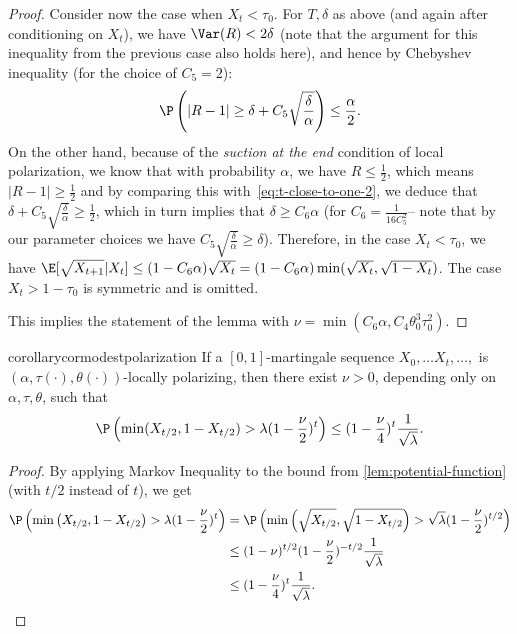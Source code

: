 \documentclass[11pt]{article}
\begin{document}
\begin{proof}
	Consider now the case when $X_t < \tau_0$. For $T, \delta$ as above (and again after conditioning on $X_t$), we have $\Var(R) < 2\delta$ (note that the argument for this inequality from the previous case also holds here), and hence by Chebyshev inequality (for the choice of $C_5=2$): 
	\begin{equation}
		\P\left(|R - 1| \ge \delta +  C_5 \sqrt{\frac{\delta}{\alpha}}\right) \leq \frac{\alpha}{2}.
		\label{eq:t-close-to-one-2}
	\end{equation}
	On the other hand, because of the \emph{suction at the end} condition of local polarization, we know that with probability $\alpha$, we have $R \le \frac{1}{2}$,
	which means $|R - 1| \ge \frac{1}{2}$ and by comparing this with~\cref{eq:t-close-to-one-2},
	we deduce that $\delta +  C_5 \sqrt{\frac{\delta}{\alpha}}\ge \frac 12$, which in turn implies that $\delta \geq C_6 \alpha$ (for $C_6=\frac{1}{16 C_5^2}$-- note that by our parameter choices we have $C_5 \sqrt{\frac{\delta}{\alpha}}\ge \delta$). 
	Therefore, in the case $X_t < \tau_0$, we have $\E [\sqrt{X_{t+1}} | X_t] \leq (1- C_6 \alpha) \sqrt{X_{t}} = (1 - C_6 \alpha) \min(\sqrt{X_{t}}, \sqrt{1 - X_{t}})$. The case $X_t > 1 - \tau_0$ is symmetric and is omitted.
	
	This implies the statement of the lemma with $\nu = \min(C_6\alpha, C_4 \theta_0^3\tau_0^2)$.
\end{proof}


\begin{restatable}{corollary}{cormodestpolarization}
	\label{cor:modest-polarization}
	If a $[0,1]$-martingale sequence $X_0, \ldots X_t, \ldots,$ is $(\alpha,\tau(\cdot),\theta(\cdot))$-locally polarizing, then there exist $\nu > 0$, depending only on $\alpha, \tau, \theta$, such that 
	\[\P\left(\min(X_{t/2}, 1-X_{t/2}) > \lambda (1 - \frac{\nu}{2})^{t} \right) \leq (1 - \frac{\nu}{4})^{t} \frac{1}{\sqrt{\lambda}}.\]
\end{restatable}
\begin{proof}
	By applying Markov Inequality to the bound from \cref{lem:potential-function} (with $t/2$ instead of $t$), we get 
	\begin{align*}
		\P\left(\min\left(X_{t/2}, 1- X_{t/2}\right) > \lambda (1 - \frac{\nu}{2})^{t}\right) &= \P\left(\min\left(\sqrt{X_{t/2}}, \sqrt{1 - X_{t/2}}\right) > \sqrt{\lambda} (1 - \frac{\nu}{2})^{t/2}\right)\\
		& \leq (1 - \nu)^{t/2}(1-\frac{\nu}{2})^{-t/2}\frac{1}{\sqrt{\lambda}}\\
		& \leq ( 1 -\frac{\nu}{4})^{t}\frac{1}{\sqrt{\lambda}}.\qedhere
	\end{align*}
\end{proof}
\end{document}
